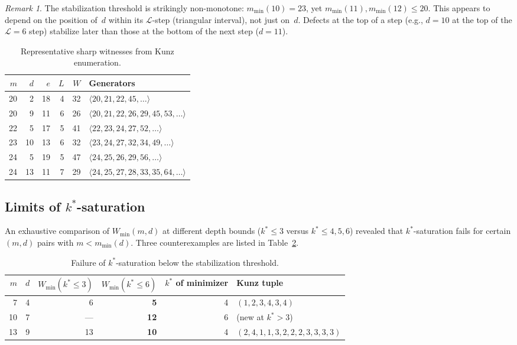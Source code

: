 \documentclass[11pt]{amsart}
\theoremstyle{definition}
\theoremstyle{remark}
\newtheorem{remark}[theorem]{Remark}
\begin{document}
\begin{remark}
The stabilization threshold is strikingly non-monotone:
$m_{\min}(10) = 23$, yet $m_{\min}(11), m_{\min}(12) \le 20$.
This appears to depend on the position of~$d$ within its
$\mathcal{L}$-step (triangular interval), not just on~$d$.
Defects at the top of a step (e.g., $d = 10$ at the top of
the $\mathcal{L} = 6$ step) stabilize later than those at the
bottom of the next step ($d = 11$).
\end{remark}

\begin{table}[ht]
\centering
\caption{Representative sharp witnesses from Kunz enumeration.}\label{tab:witnesses}
\begin{tabular}{rrrrrp{5.5cm}}
\toprule
$m$ & $d$ & $e$ & $L$ & $W$ & Generators \\
\midrule
20 & 2 & 18 & 4 & 32 & $\langle 20, 21, 22, 45, \ldots \rangle$ \\
20 & 9 & 11 & 6 & 26 & $\langle 20, 21, 22, 26, 29, 45, 53, \ldots \rangle$ \\
22 & 5 & 17 & 5 & 41 & $\langle 22, 23, 24, 27, 52, \ldots \rangle$ \\
23 & 10 & 13 & 6 & 32 & $\langle 23, 24, 27, 32, 34, 49, \ldots \rangle$ \\
24 & 5 & 19 & 5 & 47 & $\langle 24, 25, 26, 29, 56, \ldots \rangle$ \\
24 & 13 & 11 & 7 & 29 & $\langle 24, 25, 27, 28, 33, 35, 64, \ldots \rangle$ \\
\bottomrule
\end{tabular}
\end{table}

\subsection{Limits of $k^*$-saturation}\label{sec:sat-break}

An exhaustive comparison of $W_{\min}(m,d)$ at different depth bounds
($k^* \le 3$ versus $k^* \le 4, 5, 6$) revealed that $k^*$-saturation
fails for certain $(m,d)$ pairs with $m < m_{\min}(d)$.
Three counterexamples are listed in Table~\ref{tab:sat-break}.

\begin{table}[ht]
\centering
\caption{Failure of $k^*$-saturation below the stabilization threshold.}\label{tab:sat-break}
\begin{tabular}{rrrrrl}
\toprule
$m$ & $d$ & $W_{\min}(k^*\!\le\!3)$ & $W_{\min}(k^*\!\le\!6)$ & $k^*$ of minimizer & Kunz tuple \\
\midrule
 7 & 4 & 6 & \textbf{5} & 4 & $(1,2,3,4,3,4)$ \\
10 & 7 & --- & \textbf{12} & 6 & (new at $k^*>3$) \\
13 & 9 & 13 & \textbf{10} & 4 & $(2,4,1,1,3,2,2,2,3,3,3,3)$ \\
\bottomrule
\end{tabular}
\end{table}
\end{document}
